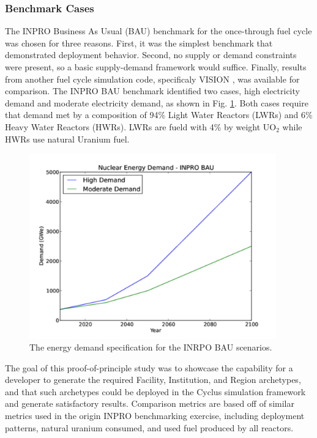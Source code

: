 \subsubsection{Benchmark Cases}

The INPRO Business As Usual (BAU) benchmark \cite{_international_2009} for the
once-through fuel cycle was chosen for three reasons. First, it was the simplest
benchmark that demonstrated deployment behavior. Second, no supply or demand
constraints were present, so a basic supply-demand framework would
suffice. Finally, results from another fuel cycle simulation code, specificaly
VISION \cite{vision2009}, was available for comparison. The INPRO BAU benchmark
identified two cases, high electricity demand and moderate electricity demand,
as shown in Fig. \ref{fig:inpro-demand}. Both cases require that demand met by a
composition of 94\% Light Water Reactors (LWRs) and 6\% Heavy Water Reactors
(HWRs). LWRs are fueld with 4\% by weight UO$_2$ while HWRs use natural Uranium
fuel.

\begin{figure}
  \begin{center}
    \includegraphics[height=8cm]{./figs/inpro-demand.pdf}
    \caption{The energy demand specification for the INRPO BAU scenarios.}
    \label{fig:inpro-demand}
  \end{center}  
\end{figure}

The goal of this proof-of-principle study was to showcase the capability for a
developer to generate the required Facility, Institution, and Region archetypes,
and that such archetypes could be deployed in the Cyclus simulation framework
and generate satisfactory results. Comparison metrics are based off of similar
metrics used in the origin INPRO benchmarking exercise, including deployment
patterns, natural uranium consumed, and used fuel produced by all reactors.

